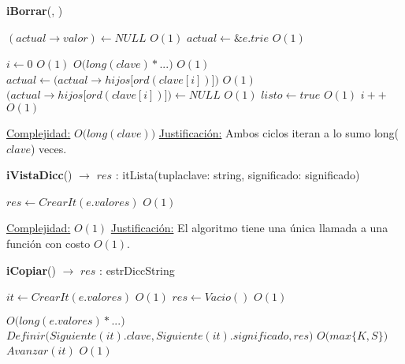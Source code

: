 \begin{Algoritmos}
\begin{algorithm}[H]{\textbf{iBorrar}(, )}
\begin{algorithmic}
        \State $(actual \to valor) \gets NULL$ \Comment $O(1)$
        \State $actual \gets \&e.trie$ \Comment $O(1)$

        \State $i \gets 0$ \Comment $O(1)$
         \Comment $O\big(long(clave) * ...\big)$
           \Comment $O(1)$
            \State $actual \gets \big(actual \to hijos\big[ord(clave[i])\big]\big)$ \Comment $O(1)$
          \Else
            \State $\big(actual \to hijos\big[ord(clave[i])\big]\big) \gets NULL$ \Comment $O(1)$
            \State $listo \gets true$ \Comment $O(1)$
          \EndIf
          \State $i++$ \Comment $O(1)$
        \EndWhile

        \medskip
        \Statex \underline{Complejidad:} {$O\big(long(clave)\big)$}
        \Statex \underline{Justificación:} {Ambos ciclos iteran a lo sumo long($clave$) veces.}
      \end{algorithmic}
\end{algorithm}


\begin{algorithm}[H]{\textbf{iVistaDicc}() $\to$ $res$ : itLista\big(tupla\big\langle clave: string, significado: significado\big\rangle\big)}
      \begin{algorithmic}
        \State $res \gets CrearIt(e.valores)$ \Comment $O(1)$

        \medskip
        \Statex \underline{Complejidad:} {$O(1)$}
        \Statex \underline{Justificación:} {El algoritmo tiene una única llamada a una función con costo $O(1)$.}
      \end{algorithmic}
\end{algorithm}

\begin{algorithm}[H]{\textbf{iCopiar}() $\to$ $res$ : estrDiccString}
      \begin{algorithmic}
        \State $it \gets CrearIt(e.valores)$ \Comment $O(1)$
        \State $res \gets Vacio()$ \Comment $O(1)$

         \Comment $O\big(long(e.valores) * ...\big)$
          \State $Definir\big(Siguiente(it).clave, Siguiente(it).significado, res\big)$ \Comment $O\big(max\{K, S\}\big)$
          \State $Avanzar(it)$ \Comment $O(1)$
        \EndWhile


\end{algorithmic}
\end{algorithm}
\end{Algoritmos}
